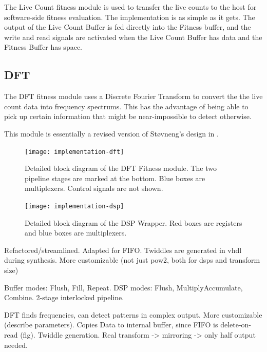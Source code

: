 The Live Count fitness module is used to transfer the live counts to the host for software-side fitness evaluation.
The implementation is as simple as it gets.
The output of the Live Count Buffer is fed directly into the Fitness buffer, and the write and read signals are activated when the Live Count Buffer has data and the Fitness Buffer has space.

\subsection{DFT}

The DFT fitness module uses a Discrete Fourier Transform to convert the the live count data into frequency spectrums.
This has the advantage of being able to pick up certain information that might be near-impossible to detect otherwise.

This module is essentially a revised version of Støvneng's design in \cite{stovneng2014sblock}.

\begin{figure}[!ht]
    \centering
    \texttt{[image: implementation-dft]}
    \caption[DFT Fitness]{
        Detailed block diagram of the DFT Fitness module.
        The two pipeline stages are marked at the bottom.
        Blue boxes are multiplexers.
        Control signals are not shown.
    }
    \label{fig:implementation-dft}
\end{figure}

\begin{figure}[!ht]
    \centering
    \texttt{[image: implementation-dsp]}
    \caption[DSP Wrapper]{
        Detailed block diagram of the DSP Wrapper.
        Red boxes are registers and blue boxes are multiplexers.
    }
    \label{fig:implementation-dsp}
\end{figure}

\TODO
Refactored/streamlined.
Adapted for FIFO.
Twiddles are generated in vhdl during synthesis.
More customizable (not just pow2, both for dsps and transform size)

Buffer modes: Flush, Fill, Repeat.
DSP modes: Flush, MultiplyAccumulate, Combine.
2-stage interlocked pipeline.

\TODO

DFT finds frequencies, can detect patterns in complex output.
More customizable (describe parameters).
Copies Data to internal buffer, since FIFO is delete-on-read (fig).
Twiddle generation.
Real transform -> mirroring -> only half output needed.


